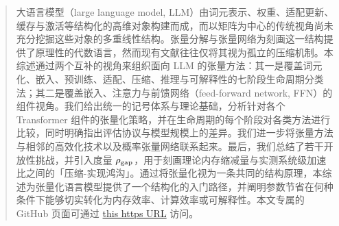
\maketitle

\begin{abstract}
大语言模型（large language model, LLM）由词元表示、权重、适配更新、缓存与激活等结构化的高维对象构建而成，而以矩阵为中心的传统视角尚未充分挖掘这些对象的多重线性结构。张量分解与张量网络为刻画这一结构提供了原理性的代数语言，然而现有文献往往仅将其视为孤立的压缩机制。本综述通过两个互补的视角来组织面向 LLM 的张量方法：其一是覆盖词元化、嵌入、预训练、适配、压缩、推理与可解释性的七阶段生命周期分类法；其二是覆盖嵌入、注意力与前馈网络（feed-forward network, FFN）的组件视角。我们给出统一的记号体系与理论基础，分析针对各个 Transformer 组件的张量化策略，并在生命周期的每个阶段对各类方法进行比较，同时明确指出评估协议与模型规模上的差异。我们进一步将张量方法与相邻的高效化技术以及概率张量网络联系起来。最后，我们总结了若干开放性挑战，并引入度量 $\rho_{\rm gap}$，用于刻画理论内存缩减量与实测系统级加速比之间的「压缩-实现鸿沟」。通过将张量化视为一条共同的结构原理，本综述为张量化语言模型提供了一个结构化的入门路径，并阐明参数节省在何种条件下能够切实转化为内存效率、计算效率或可解释性。本文专属的 GitHub 页面可通过 \href{https://github.com/ma-tt-a/awesome-tensor-methods-for-llms}{this https URL} 访问。


\end{abstract}

